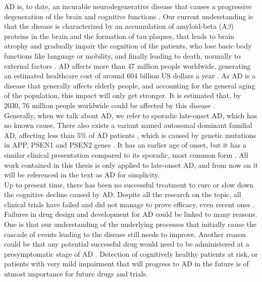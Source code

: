 AD is, to date, an incurable neurodegenerative disease that causes a progressive degeneration of the brain and cognitive functions \cite{Lane2018}. Our current understanding is that the disease is characterized by an accumulation of amyloid-beta (A$\beta$) proteins in the brain and the formation of tau plaques, that leads to brain atrophy and gradually impair the cognition of the patients, who lose basic body functions like language or mobility, and finally leading to death, normally to external factors \cite{Ballard2011}. AD affects more than 47 million people worldwide, generating an estimated healthcare cost of around 604 billion US dollars a year \cite{AlzheimersAssociation}. As AD is a disease that generally affects elderly people, and accounting for the general aging of the population, this impact will only get stronger. It is estimated that, by 2030, 76 million people worldwide could be affected by this disease \cite{AlzheimersAssociation}. \\

Generally, when we talk about AD, we refer to sporadic late-onset AD, which has no known cause. There also exists a variant named autosomal dominant familial AD, affecting less than $5\%$ of AD patients \cite{Bird1993}, which is caused by genetic mutations in APP, PSEN1 and PSEN2 genes \cite{Campion1999}. It has an earlier age of onset, but it has a similar clinical presentation compared to its sporadic, most common form \cite{Ryan2016}. All work contained in this thesis is only applied to late-onset AD, and from now on it will be referenced in the text as AD for simplicity. \\

Up to present time, there has been no successful treatment to cure or slow down the cognitive decline caused by AD. Despite all the research on the topic, all clinical trials have failed \cite{Mehta2017} and did not manage to prove efficacy, even recent ones \cite{Huang2020}. Failures in drug design and development for AD could be linked to many reasons. One is that our understanding of the underlying processes that initially cause the cascade of events leading to the disease still needs to improve. Another reason could be that any potential successful drug would need to be administered at a presymptomatic stage of AD \cite{Mehta2017,Huang2020}. Detection of cognitively healthy patients at risk, or patients with very mild impairment that will progress to AD in the future is of utmost importance for future drugs and trials. \\ 

